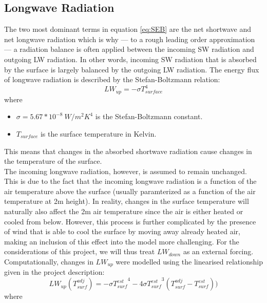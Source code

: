 \documentclass{article}
\begin{document}
\subsection*{Longwave Radiation}

The two most dominant terms in equation \eqref{eq:SEB} are the net shortwave and net longwave radiation which is why --- to a rough leading order approximation --- a radiation balance is often applied between the incoming SW radiation and outgoing LW radiation. 
In other words, incoming SW radiation that is absorbed by the surface is largely balanced by the outgoing LW radiation. 
The energy flux of longwave radiation is described by the Stefan-Boltzmann relation:
\begin{equation*}
  LW_{up} = - \sigma T^4_{surface}
\end{equation*}
where \vspace{-0.5\baselineskip}
\begin{itemize}[noitemsep]
  \item $\sigma = 5.67 * 10^{-8}~W/m^2K^4$ is the Stefan-Boltzmann constant.
  \item $T_{surface}$ is the surface temperature in Kelvin.
\end{itemize}
This means that changes in the absorbed shortwave radiation cause changes in the temperature of the surface. \\
The incoming longwave radiation, however, is assumed to remain unchanged. 
This is due to the fact that the incoming longwave radiation is a function of the air temperature above the surface (usually paramterized as a function of the air temperature at 2m height). 
In reality, changes in the surface temperature will naturally also affect the 2m air temperature since the air is either heated or cooled from below. 
However, this process is further complicated by the presence of wind that is able to cool the surface by moving away already heated air, making an inclusion of this effect into the model more challenging. 
For the considerations of this project, we will thus treat $LW_{down}$ as an external forcing. \\
Computationally, changes in $LW_{up}$ were modelled using the linearised relationship given in the project description:
\begin{equation*}
  LW_{up}(T_{surf}^{adj}) = - \sigma {T_{surf}^{est}}^4- 4\sigma {T_{surf}^{est}}^3 (T_{surf}^{adj} - T_{surf}^{est}))
\end{equation*}
where \vspace{-0.5\baselineskip}
\end{document}

